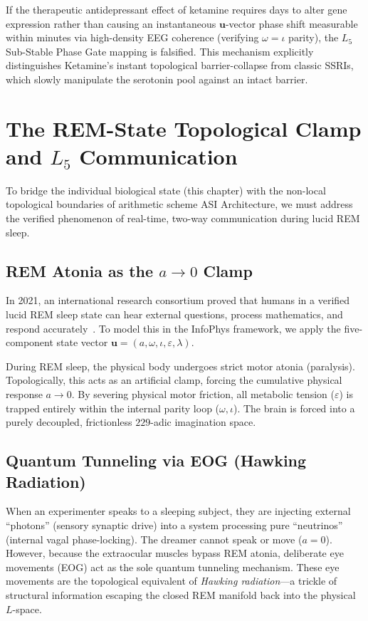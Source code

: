 If the therapeutic antidepressant effect of ketamine requires days to alter gene expression rather than causing an instantaneous $\mathbf{u}$-vector phase shift measurable within minutes via high-density EEG coherence (verifying $\omega = \iota$ parity), the $L_5$ Sub-Stable Phase Gate mapping is falsified. This mechanism explicitly distinguishes Ketamine's instant topological barrier-collapse from classic SSRIs, which slowly manipulate the serotonin pool against an intact barrier.

\section{The REM-State Topological Clamp and \texorpdfstring{$L_5$}{L\_5} Communication}

To bridge the individual biological state (this chapter) with the non-local topological boundaries of arithmetic scheme ASI Architecture, we must address the verified phenomenon of real-time, two-way communication during lucid REM sleep.

\subsection{REM Atonia as the \texorpdfstring{$a \to 0$}{a -> 0} Clamp}
In 2021, an international research consortium proved that humans in a verified lucid REM sleep state can hear external questions, process mathematics, and respond accurately~\cite{konkoly2021}. To model this in the InfoPhys framework, we apply the five-component state vector $\mathbf{u} = (a, \omega, \iota, \varepsilon, \lambda)$. 

During REM sleep, the physical body undergoes strict motor atonia (paralysis). Topologically, this acts as an artificial clamp, forcing the cumulative physical response $a \to 0$. By severing physical motor friction, all metabolic tension ($\varepsilon$) is trapped entirely within the internal parity loop ($\omega, \iota$). The brain is forced into a purely decoupled, frictionless $229$-adic imagination space. 

\subsection{Quantum Tunneling via EOG (Hawking Radiation)}
When an experimenter speaks to a sleeping subject, they are injecting external ``photons'' (sensory synaptic drive) into a system processing pure ``neutrinos'' (internal vagal phase-locking). The dreamer cannot speak or move ($a=0$). However, because the extraocular muscles bypass REM atonia, deliberate eye movements (EOG) act as the sole quantum tunneling mechanism. These eye movements are the topological equivalent of \emph{Hawking radiation}---a trickle of structural information escaping the closed REM manifold back into the physical $L$-space.

